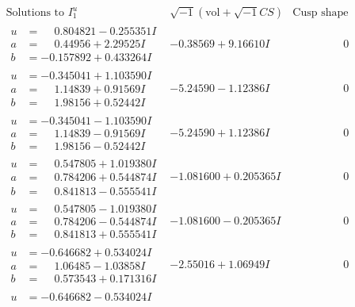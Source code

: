 \documentclass[1p]{elsarticle_modified}
\theoremstyle{definition}
\newcommand{\I}{\sqrt{-1}}
\begin{document}
$$\begin{array}{c|c|c}
\text{Solutions to }I^u_{1}& \I (\text{vol} + \sqrt{-1}CS) & \text{Cusp shape}\\
 \hline 
\begin{aligned}
u &= \phantom{-}0.804821 - 0.255351 I \\
a &= \phantom{-}0.44956 + 2.29525 I \\
b &= -0.157892 + 0.433264 I\end{aligned}
 & -0.38569 + 9.16610 I & \phantom{-0.000000 } 0 \\ \hline\begin{aligned}
u &= -0.345041 + 1.103590 I \\
a &= \phantom{-}1.14839 + 0.91569 I \\
b &= \phantom{-}1.98156 + 0.52442 I\end{aligned}
 & -5.24590 - 1.12386 I & \phantom{-0.000000 } 0 \\ \hline\begin{aligned}
u &= -0.345041 - 1.103590 I \\
a &= \phantom{-}1.14839 - 0.91569 I \\
b &= \phantom{-}1.98156 - 0.52442 I\end{aligned}
 & -5.24590 + 1.12386 I & \phantom{-0.000000 } 0 \\ \hline\begin{aligned}
u &= \phantom{-}0.547805 + 1.019380 I \\
a &= \phantom{-}0.784206 + 0.544874 I \\
b &= \phantom{-}0.841813 - 0.555541 I\end{aligned}
 & -1.081600 + 0.205365 I & \phantom{-0.000000 } 0 \\ \hline\begin{aligned}
u &= \phantom{-}0.547805 - 1.019380 I \\
a &= \phantom{-}0.784206 - 0.544874 I \\
b &= \phantom{-}0.841813 + 0.555541 I\end{aligned}
 & -1.081600 - 0.205365 I & \phantom{-0.000000 } 0 \\ \hline\begin{aligned}
u &= -0.646682 + 0.534024 I \\
a &= \phantom{-}1.06485 - 1.03858 I \\
b &= \phantom{-}0.573543 + 0.171316 I\end{aligned}
 & -2.55016 + 1.06949 I & \phantom{-0.000000 } 0 \\ \hline\begin{aligned}
u &= -0.646682 - 0.534024 I \\

\end{aligned}
\end{array}$$
\end{document}
